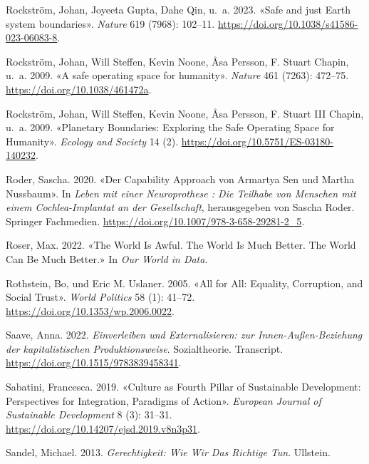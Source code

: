\documentclass[
  nswissgerman,
  a4paper,
  openany]{book}
\newlength{\cslhangindent}
\newenvironment{CSLReferences}[2] %
 {\begin{list}{}{%
  \setlength{\itemindent}{0pt}
  \setlength{\leftmargin}{0pt}
  \setlength{\parsep}{0pt}
  \ifodd #1
   \setlength{\leftmargin}{\cslhangindent}
   \setlength{\itemindent}{-1\cslhangindent}
  \fi
  \setlength{\itemsep}{#2\baselineskip}}}
 {\end{list}}
\begin{document}
\begin{CSLReferences}{1}{1}
Rockström, Johan, Joyeeta Gupta, Dahe Qin, u.~a. 2023. {«Safe and just
{Earth} system boundaries»}. \emph{Nature} 619 (7968): 102--11.
\url{https://doi.org/10.1038/s41586-023-06083-8}.

Rockström, Johan, Will Steffen, Kevin Noone, Åsa Persson, F. Stuart
Chapin, u.~a. 2009. {«A safe operating space for humanity»}.
\emph{Nature} 461 (7263): 472--75.
\url{https://doi.org/10.1038/461472a}.

{Rockström, Johan, Will Steffen, Kevin Noone, Åsa Persson, F. Stuart III
Chapin, u.~a.} 2009. {«Planetary {Boundaries}: {Exploring} the {Safe
Operating Space} for {Humanity}»}. \emph{Ecology and Society} 14 (2).
\url{https://doi.org/10.5751/ES-03180-140232}.

Roder, Sascha. 2020. {«{Der Capability Approach von Armartya Sen und
Martha Nussbaum}»}. In \emph{{Leben mit einer Neuroprothese : Die
Teilhabe von Menschen mit einem Cochlea-Implantat an der Gesellschaft}},
herausgegeben von Sascha Roder. Springer Fachmedien.
\url{https://doi.org/10.1007/978-3-658-29281-2_5}.

Roser, Max. 2022. {«The World Is Awful. {The} World Is Much Better.
{The} World Can Be Much Better.»} In \emph{Our World in Data}.

Rothstein, Bo, und Eric M. Uslaner. 2005. {«All for {All}: {Equality},
{Corruption}, and {Social Trust}»}. \emph{World Politics} 58 (1):
41--72. \url{https://doi.org/10.1353/wp.2006.0022}.

Saave, Anna. 2022. \emph{{Einverleiben und Externalisieren: zur
Innen-Au{ß}en-Beziehung der kapitalistischen Produktionsweise}}.
{Sozialtheorie}. Transcript.
\url{https://doi.org/10.1515/9783839458341}.

Sabatini, Francesca. 2019. {«Culture as {Fourth Pillar} of {Sustainable
Development}: {Perspectives} for {Integration}, {Paradigms} of
{Action}»}. \emph{European Journal of Sustainable Development} 8 (3):
31--31. \url{https://doi.org/10.14207/ejsd.2019.v8n3p31}.

Sandel, Michael. 2013. \emph{Gerechtigkeit: {Wie} Wir Das {Richtige}
Tun}. Ullstein.


\end{CSLReferences}
\end{document}
